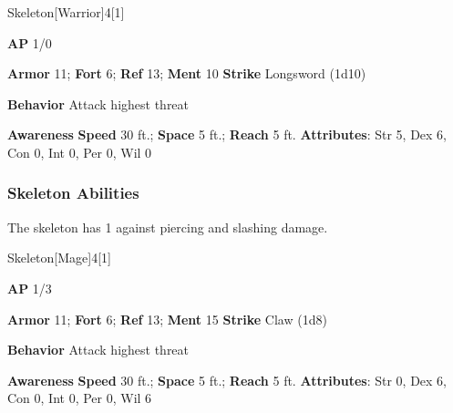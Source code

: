 \begin{monsection}{Skeleton}[Warrior]{4}[1]
\vspace{-1em}\vspace{-1em}
\begin{spellcontent}
\begin{spelltargetinginfo}
{\textbf{AP} 1/0}

\pari \textbf{Armor} 11;
\textbf{Fort} 6;
\textbf{Ref} 13;
\textbf{Ment} 10
\pari \textbf{Strike} Longsword  (1d10)



\pari \textbf{Behavior} Attack highest threat
\end{spelltargetinginfo}
\end{spellcontent}

\begin{monsterfooter}
\pari \textbf{Awareness} 
\pari \textbf{Speed} 30 ft.;
\textbf{Space} 5 ft.;
\textbf{Reach} 5 ft.
\pari \textbf{Attributes}:
Str 5,
Dex 6,
Con 0,
Int 0,
Per 0,
Wil 0
\end{monsterfooter}
\end{monsection}


\subsubsection{Skeleton Abilities}

The skeleton has  1 against piercing and slashing damage.

\begin{monsection}{Skeleton}[Mage]{4}[1]
\vspace{-1em}\vspace{-1em}
\begin{spellcontent}
\begin{spelltargetinginfo}
{\textbf{AP} 1/3}

\pari \textbf{Armor} 11;
\textbf{Fort} 6;
\textbf{Ref} 13;
\textbf{Ment} 15
\pari \textbf{Strike} Claw  (1d8)



\pari \textbf{Behavior} Attack highest threat
\end{spelltargetinginfo}
\end{spellcontent}

\begin{monsterfooter}
\pari \textbf{Awareness} 
\pari \textbf{Speed} 30 ft.;
\textbf{Space} 5 ft.;
\textbf{Reach} 5 ft.
\pari \textbf{Attributes}:
Str 0,
Dex 6,
Con 0,
Int 0,
Per 0,
Wil 6
\end{monsterfooter}
\end{monsection}


